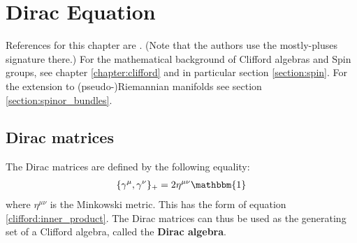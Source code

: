 \chapter{Dirac Equation}\label{chapter:dirac}

    References for this chapter are \cite{supergravity}. (Note that the authors use the mostly-pluses signature there.) For the mathematical background of Clifford algebras and Spin groups, see chapter \ref{chapter:clifford} and in particular section \ref{section:spin}. For the extension to (pseudo-)Riemannian manifolds see section \ref{section:spinor_bundles}.

\section{Dirac matrices}

    \begin{property}
        The Dirac matrices are defined by the following equality:
        \begin{gather}
            \label{dirac:clifford_relation}
            \{\gamma^\mu,\gamma^\nu\}_+ = 2\eta^{\mu\nu}\mathbbm{1}
        \end{gather}
        where $\eta^{\mu\nu}$ is the Minkowski metric. This has the form of equation \ref{clifford:inner_product}. The Dirac matrices can thus be used as the generating set of a Clifford algebra, called the \textbf{Dirac algebra}.
    \end{property}

